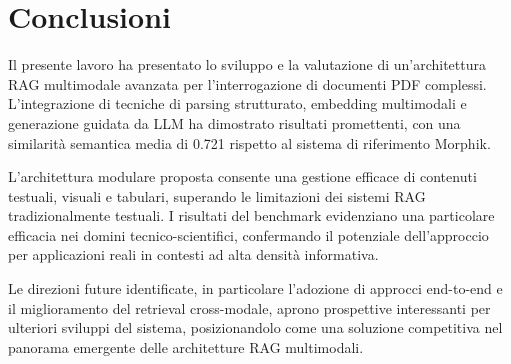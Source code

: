 \section{Conclusioni}
Il presente lavoro ha presentato lo sviluppo e la valutazione di un'architettura RAG multimodale avanzata per l'interrogazione di documenti PDF complessi. L'integrazione di tecniche di parsing strutturato, embedding multimodali e generazione guidata da LLM ha dimostrato risultati promettenti, con una similarità semantica media di 0.721 rispetto al sistema di riferimento Morphik.

L'architettura modulare proposta consente una gestione efficace di contenuti testuali, visuali e tabulari, superando le limitazioni dei sistemi RAG tradizionalmente testuali. I risultati del benchmark evidenziano una particolare efficacia nei domini tecnico-scientifici, confermando il potenziale dell'approccio per applicazioni reali in contesti ad alta densità informativa.

Le direzioni future identificate, in particolare l'adozione di approcci end-to-end e il miglioramento del retrieval cross-modale, aprono prospettive interessanti per ulteriori sviluppi del sistema, posizionandolo come una soluzione competitiva nel panorama emergente delle architetture RAG multimodali.

